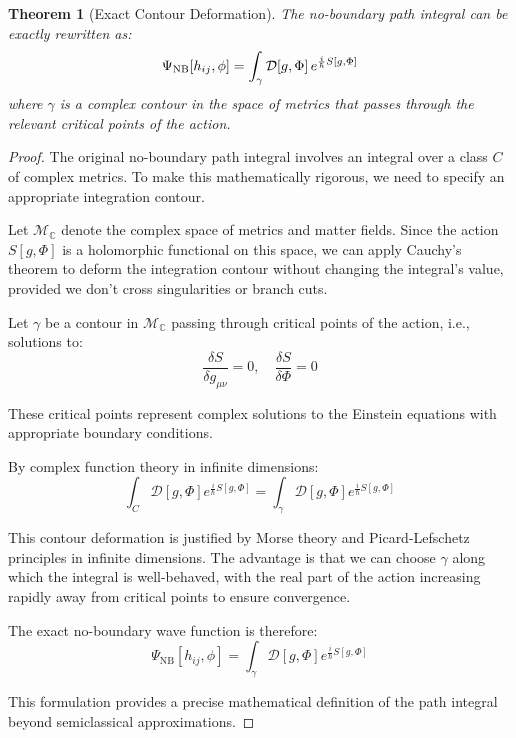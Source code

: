 \documentclass{article}
\newtheorem{theorem}{Theorem}
\begin{document}
\begin{theorem}[Exact Contour Deformation]
  The no-boundary path integral can be exactly rewritten as:
  \begin{equation}
    \Psi_{\text{NB}} [h_{ij}, \phi] = \int_{\gamma} \mathcal{D} [g, \Phi] 
    \hspace{0.17em} e^{\frac{i}{\hbar} S [g, \Phi]}
  \end{equation}
  where $\gamma$ is a complex contour in the space of metrics that passes
  through the relevant critical points of the action.
\end{theorem}

\begin{proof}
The original no-boundary path integral involves an integral over a class $C$ of complex metrics. To make this mathematically rigorous, we need to specify an appropriate integration contour.

Let $\mathcal{M}_\mathbb{C}$ denote the complex space of metrics and matter fields. Since the action $S[g, \Phi]$ is a holomorphic functional on this space, we can apply Cauchy's theorem to deform the integration contour without changing the integral's value, provided we don't cross singularities or branch cuts.

Let $\gamma$ be a contour in $\mathcal{M}_\mathbb{C}$ passing through critical points of the action, i.e., solutions to:
\begin{equation}
\frac{\delta S}{\delta g_{\mu\nu}} = 0, \quad \frac{\delta S}{\delta \Phi} = 0
\end{equation}

These critical points represent complex solutions to the Einstein equations with appropriate boundary conditions.

By complex function theory in infinite dimensions:
\begin{equation}
\int_C \mathcal{D}[g, \Phi] e^{\frac{i}{\hbar}S[g, \Phi]} = \int_\gamma \mathcal{D}[g, \Phi] e^{\frac{i}{\hbar}S[g, \Phi]}
\end{equation}

This contour deformation is justified by Morse theory and Picard-Lefschetz principles in infinite dimensions. The advantage is that we can choose $\gamma$ along which the integral is well-behaved, with the real part of the action increasing rapidly away from critical points to ensure convergence.

The exact no-boundary wave function is therefore:
\begin{equation}
\Psi_\text{NB}[h_{ij}, \phi] = \int_\gamma \mathcal{D}[g, \Phi] e^{\frac{i}{\hbar}S[g, \Phi]}
\end{equation}

This formulation provides a precise mathematical definition of the path integral beyond semiclassical approximations.
\end{proof}
\end{document}
